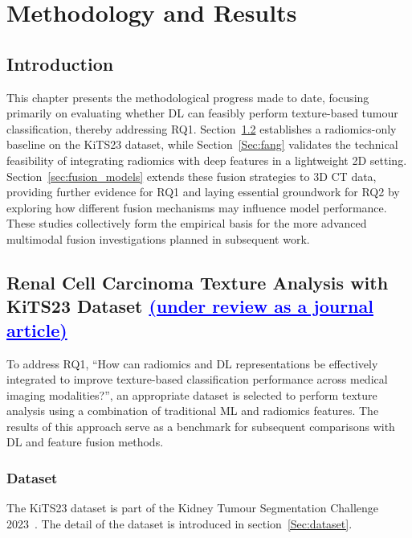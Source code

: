 \chapter{Methodology and Results}\label{chap:field}

\section{Introduction}\label{sec:method_intro}
This chapter presents the methodological progress made to date, focusing primarily on evaluating whether DL can feasibly perform texture-based tumour classification, thereby addressing RQ1. Section~\ref{Sec:texture} establishes a radiomics-only baseline on the KiTS23 dataset, while Section~\ref{Sec:fang} validates the technical feasibility of integrating radiomics with deep features in a lightweight 2D setting. Section~\ref{sec:fusion_models} extends these fusion strategies to 3D CT data, providing further evidence for RQ1 and laying essential groundwork for RQ2 by exploring how different fusion mechanisms may influence model performance. These studies collectively form the empirical basis for the more advanced multimodal fusion investigations planned in subsequent work.

\section{Renal Cell Carcinoma Texture Analysis with KiTS23 Dataset \textcolor{blue}{\uline{(under review as a journal article)}}}\label{Sec:texture}
To address RQ1, “How can radiomics and DL representations be effectively integrated to improve texture-based classification performance across medical imaging modalities?”, an appropriate dataset is selected to perform texture analysis using a combination of traditional ML and radiomics features. The results of this approach serve as a benchmark for subsequent comparisons with DL and feature fusion methods.

\subsection{Dataset}\label{subsec:summative_methodology}
The KiTS23 dataset is part of the Kidney Tumour Segmentation Challenge 2023~\cite{kitsIntro}. The detail of the dataset is introduced in section~\ref{Sec:dataset}.

